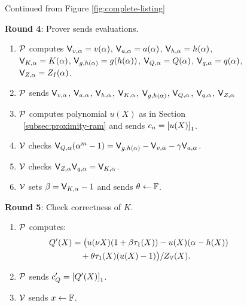 \begin{figure}[t!]
    \begin{mdframed}
        \begin{center}
            Continued from Figure \ref{fig:complete-listing}
        \end{center}
        {\bf Round 4}: Prover sends evaluations.
        \begin{enumerate}[leftmargin=1em, label=\arabic*.]
            \item $\prover$ computes $\val{\alpha}{v}=v(\alpha)$, $\val{\alpha}{a}=a(\alpha)$, $\val{\alpha}{h}=h(\alpha)$, $\val{\alpha}{K}=K(\alpha)$,
            $\val{h(\alpha)}{g}=g(h(\alpha))$, $\val{\alpha}{Q}=Q(\alpha)$, $\val{\alpha}{q}=q(\alpha)$, $\val{\alpha}{Z}=Z_I(\alpha)$.
            \item $\prover$ sends $\val{\alpha}{v}$, $\val{\alpha}{a}$, $\val{\alpha}{h}$, $\val{\alpha}{K}$, $\val{h(\alpha)}{g}$, $\val{\alpha}{Q}$,
            $\val{\alpha}{q}$, $\val{\alpha}{Z}$
            \item $\prover$ computes polynomial $u(X)$ as in Section ~\ref{subsec:proximity-ram}
            and sends $c_u=\gone{u(X)}$.
            \item $\verifier$ checks $\val{\alpha}{Q}(\alpha^m-1)=\val{h(\alpha)}{g}-\val{\alpha}{v}-\gamma \val{\alpha}{a}$.
            \item $\verifier$ checks $\val{\alpha}{Z}\val{\alpha}{q}=\val{\alpha}{K}$.
            \item $\verifier$ sets $\beta=\val{\alpha}{K}-1$ and sends $\theta\gets\F$.
        \end{enumerate}

        {\bf Round 5}: Check correctness of $K$.
        \begin{enumerate}[leftmargin=1em, label=\arabic*.]
            \item $\prover$ computes:
            \begin{align*}
                Q'(X) &= \big(u(\nu X)(1+\beta \tau_1(X))-u(X)(\alpha - h(X)) \\
                &\quad + \theta \tau_1(X)(u(X)-1)\big)/Z_\setV(X).
            \end{align*}
            \item $\prover$ sends $c_Q'=\gone{Q'(X)}$.
            \item $\verifier$ sends $x\gets \F$.
        \end{enumerate}


\end{mdframed}
\end{figure}
